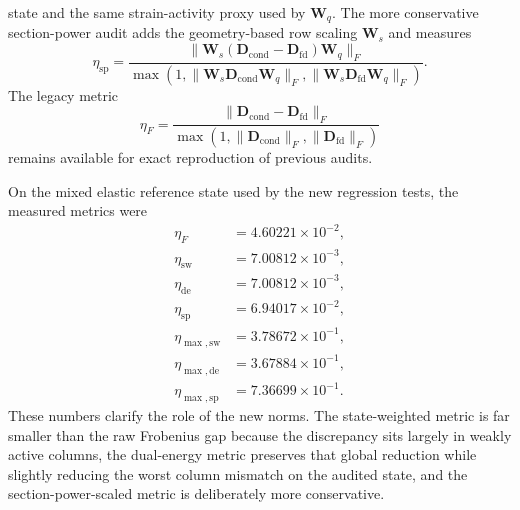 state and the same strain-activity proxy used by \(\mathbf{W}_q\).  The more
conservative section-power audit adds the geometry-based row scaling
\(\mathbf{W}_s\) and measures
\begin{equation}
  \eta_{\mathrm{sp}}
  =
  \frac{\lVert
      \mathbf{W}_s(\mathbf{D}_{\mathrm{cond}}-\mathbf{D}_{\mathrm{fd}})
      \mathbf{W}_q
    \rVert_F}
       {\max\!\left(
          1,
          \lVert \mathbf{W}_s \mathbf{D}_{\mathrm{cond}}\mathbf{W}_q \rVert_F,
          \lVert \mathbf{W}_s \mathbf{D}_{\mathrm{fd}}\mathbf{W}_q \rVert_F
       \right)}.
\end{equation}
The legacy metric
\begin{equation}
  \eta_{F}
  =
  \frac{\lVert \mathbf{D}_{\mathrm{cond}}
         - \mathbf{D}_{\mathrm{fd}} \rVert_F}
       {\max\!\left(1,
           \lVert \mathbf{D}_{\mathrm{cond}} \rVert_F,
           \lVert \mathbf{D}_{\mathrm{fd}} \rVert_F\right)}
\end{equation}
remains available for exact reproduction of previous audits.

On the mixed elastic reference state used by the new regression tests, the
measured metrics were
\begin{align}
  \eta_{F} &= 4.60221\times 10^{-2}, \\
  \eta_{\mathrm{sw}} &= 7.00812\times 10^{-3}, \\
  \eta_{\mathrm{de}} &= 7.00812\times 10^{-3}, \\
  \eta_{\mathrm{sp}} &= 6.94017\times 10^{-2}, \\
  \eta_{\max,\mathrm{sw}} &= 3.78672\times 10^{-1}, \\
  \eta_{\max,\mathrm{de}} &= 3.67884\times 10^{-1}, \\
  \eta_{\max,\mathrm{sp}} &= 7.36699\times 10^{-1}.
\end{align}
These numbers clarify the role of the new norms.  The state-weighted metric is
far smaller than the raw Frobenius gap because the discrepancy sits largely in
weakly active columns, the dual-energy metric preserves that global reduction
while slightly reducing the worst column mismatch on the audited state, and the
section-power-scaled metric is deliberately more conservative.

